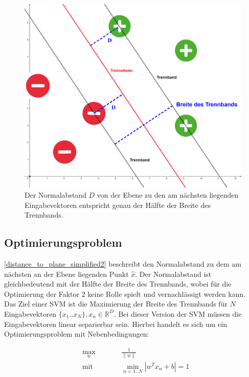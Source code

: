 \documentclass[a4paper,11pt,twoside]{scrreprt}
\newcommand{\norm}[1]{\lVert#1\rVert}
\begin{document}
\begin{figure}[H]
	\centering
	\includegraphics[width = 12cm]{assets/trennband_mit_D.png}
	\caption{Der Normalabstand $D$ von der Ebene zu den am nächsten liegenden Eingabevektoren entspricht genau der Hälfte der Breite des Trennbands.}
	\label{fig:trennband2}
\end{figure}


\subsection{Optimierungsproblem}

\autoref{distance_to_plane_simplified2} beschreibt den Normalabstand zu dem am nächsten an der Ebene liegenden Punkt $\hat{x}$. Der Normalabstand ist gleichbedeutend mit der Hälfte der Breite des Trennbands, wobei für die Optimierung der Faktor $2$ keine Rolle spielt und vernachlässigt werden kann. \\
Das Ziel einer \ac{SVM} ist die Maximierung der Breite des Trennbands für $N$ Eingabevektoren $\{x_{1}..x_{N}\}, x_{n} \in \mathbb{R}^{D}$. Bei dieser Version der \ac{SVM} müssen die Eingabevektoren linear separierbar sein. Hierbei handelt es sich um ein Optimierungsproblem mit Nebenbedingungen:

\begin{subequations}
	\begin{alignat}{2}
		&\!\max_{w}        &\qquad&  \frac{1}{\norm{w}} \label{eq:optProb}\\
		&\text{mit } &      & \min_{n=1..N} |w^{T} x_{n} + b| = 1 \label{eq:constraint1}
	\end{alignat}
\end{subequations}
\end{document}
